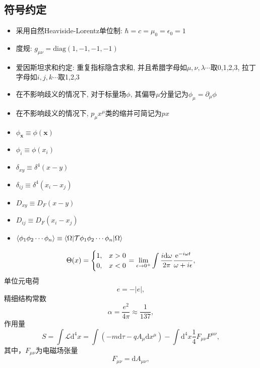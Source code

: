 \subsection{符号约定}
\begin{itemize}
    \item 采用自然Heaviside-Lorentz单位制: $\hbar = c = \mu_0 = \epsilon_0 = 1$
    \item 度规: $g_{\mu\nu} = \mathrm{diag}(1,-1,-1,-1)$
    \item 爱因斯坦求和约定: 重复指标隐含求和, 并且希腊字母如$\mu,\nu,\lambda\cdots$取0,1,2,3, 拉丁字母如$i,j,k\cdots$取1,2,3
    \item 在不影响歧义的情况下, 对于标量场$\phi$, 其偏导$\mu$分量记为$\phi_\mu=\partial_\mu\phi$
    \item 在不影响歧义的情况下, $p_\mu x^\mu$类的缩并可简记为$px$
    \item $\phi_\mathbf x\equiv\phi(\mathbf x)$
    \item $\phi_i\equiv\phi(x_i)$
    \item $\delta_{xy}\equiv\delta^4(x-y)$
    \item $\delta_{ij}\equiv\delta^4(x_i-x_j)$
    \item $D_{xy}\equiv D_F(x-y)$
    \item $D_{ij}\equiv D_F(x_i-x_j)$
    \item $\braket{\phi_1\phi_2\cdots\phi_n}\equiv\braket{\Omega|\mathcal T\phi_1\phi_2\cdots\phi_n|\Omega}$
\end{itemize}
\begin{equation}
    \Theta(x)=\begin{cases}
        1, & x>0\\
        0, & x<0
    \end{cases}=\lim_{\epsilon\to0^+}\int\frac{i\mathrm d\omega}{2\pi}\frac{\mathrm e^{-i\omega t}}{\omega+i\epsilon}\label{Theta-definition},
\end{equation}
单位元电荷
\begin{equation}
    e=-|e|,
\end{equation}
精细结构常数
\begin{equation}
    \alpha=\frac{e^2}{4\pi}\approx \frac{1}{137},
\end{equation}
作用量
\begin{equation}
    S = \int \mathcal{L} \mathrm d^4x=\int (-m\mathrm d\tau-qA_\mu\mathrm dx^\mu)-\int \mathrm d^4x \frac14 F_{\mu\nu}F^{\mu\nu},
\end{equation}
其中，$F_{\mu\nu}$为电磁场张量
\begin{equation}
    F_{\mu\nu} = \mathrm dA_{\mu\nu},
\end{equation}
